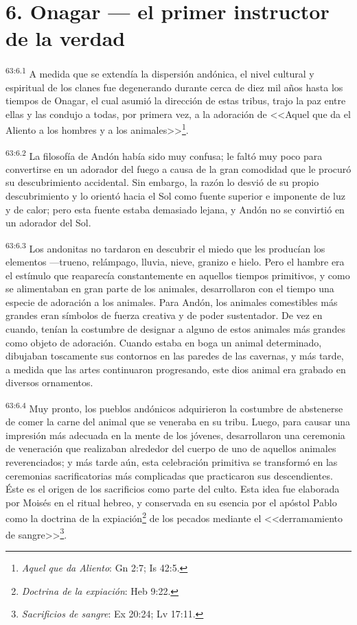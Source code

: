 \section*{6. Onagar --- el primer instructor de la verdad}
\par
\textsuperscript{63:6.1} A medida que se extendía la dispersión andónica, el nivel cultural y espiritual de los clanes fue degenerando durante cerca de diez mil años hasta los tiempos de Onagar, el cual asumió la dirección de estas tribus, trajo la paz entre ellas y las condujo a todas, por primera vez, a la adoración de <<Aquel que da el Aliento a los hombres y a los animales>>\footnote{\textit{Aquel que da Aliento}: Gn 2:7; Is 42:5.}.

\par
\textsuperscript{63:6.2} La filosofía de Andón había sido muy confusa; le faltó muy poco para convertirse en un adorador del fuego a causa de la gran comodidad que le procuró su descubrimiento accidental. Sin embargo, la razón lo desvió de su propio descubrimiento y lo orientó hacia el Sol como fuente superior e imponente de luz y de calor; pero esta fuente estaba demasiado lejana, y Andón no se convirtió en un adorador del Sol.

\par
\textsuperscript{63:6.3} Los andonitas no tardaron en descubrir el miedo que les producían los elementos ---trueno, relámpago, lluvia, nieve, granizo e hielo. Pero el hambre era el estímulo que reaparecía constantemente en aquellos tiempos primitivos, y como se alimentaban en gran parte de los animales, desarrollaron con el tiempo una especie de adoración a los animales. Para Andón, los animales comestibles más grandes eran símbolos de fuerza creativa y de poder sustentador. De vez en cuando, tenían la costumbre de designar a alguno de estos animales más grandes como objeto de adoración. Cuando estaba en boga un animal determinado, dibujaban toscamente sus contornos en las paredes de las cavernas, y más tarde, a medida que las artes continuaron progresando, este dios animal era grabado en diversos ornamentos.

\par
\textsuperscript{63:6.4} Muy pronto, los pueblos andónicos adquirieron la costumbre de abstenerse de comer la carne del animal que se veneraba en su tribu. Luego, para causar una impresión más adecuada en la mente de los jóvenes, desarrollaron una ceremonia de veneración que realizaban alrededor del cuerpo de uno de aquellos animales reverenciados; y más tarde aún, esta celebración primitiva se transformó en las ceremonias sacrificatorias más complicadas que practicaron sus descendientes. Éste es el origen de los sacrificios como parte del culto. Esta idea fue elaborada por Moisés en el ritual hebreo, y conservada en su esencia por el apóstol Pablo como la doctrina de la expiación\footnote{\textit{Doctrina de la expiación}: Heb 9:22.} de los pecados mediante el <<derramamiento de sangre>>\footnote{\textit{Sacrificios de sangre}: Ex 20:24; Lv 17:11.}.

